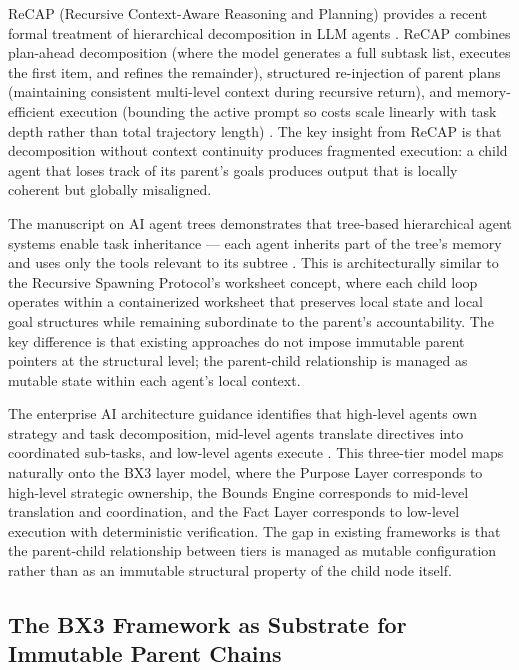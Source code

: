 ReCAP (Recursive Context-Aware Reasoning and Planning) provides a recent formal treatment of hierarchical decomposition in LLM agents \cite{recap2025}. ReCAP combines plan-ahead decomposition (where the model generates a full subtask list, executes the first item, and refines the remainder), structured re-injection of parent plans (maintaining consistent multi-level context during recursive return), and memory-efficient execution (bounding the active prompt so costs scale linearly with task depth rather than total trajectory length) \cite{recap2025}. The key insight from ReCAP is that decomposition without context continuity produces fragmented execution: a child agent that loses track of its parent's goals produces output that is locally coherent but globally misaligned.

The manuscript on AI agent trees demonstrates that tree-based hierarchical agent systems enable task inheritance — each agent inherits part of the tree's memory and uses only the tools relevant to its subtree \cite{manus2025}. This is architecturally similar to the Recursive Spawning Protocol's worksheet concept, where each child loop operates within a containerized worksheet that preserves local state and local goal structures while remaining subordinate to the parent's accountability. The key difference is that existing approaches do not impose immutable parent pointers at the structural level; the parent-child relationship is managed as mutable state within each agent's local context.

The enterprise AI architecture guidance identifies that high-level agents own strategy and task decomposition, mid-level agents translate directives into coordinated sub-tasks, and low-level agents execute \cite{shaw2025}. This three-tier model maps naturally onto the BX3 layer model, where the Purpose Layer corresponds to high-level strategic ownership, the Bounds Engine corresponds to mid-level translation and coordination, and the Fact Layer corresponds to low-level execution with deterministic verification. The gap in existing frameworks is that the parent-child relationship between tiers is managed as mutable configuration rather than as an immutable structural property of the child node itself.

\subsection{The BX3 Framework as Substrate for Immutable Parent Chains}
\label{sec:bx3-substrate}

